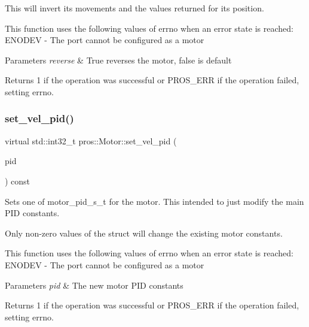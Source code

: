 This will invert its movements and the values returned for its position.

This function uses the following values of errno when an error state is reached\+: E\+N\+O\+D\+EV -\/ The port cannot be configured as a motor


\begin{DoxyParams}{Parameters}
{\em reverse} & True reverses the motor, false is default\\
\hline
\end{DoxyParams}
\begin{DoxyReturn}{Returns}
1 if the operation was successful or P\+R\+O\+S\+\_\+\+E\+RR if the operation failed, setting errno. 
\end{DoxyReturn}
\mbox{\label{classpros_1_1Motor_a69169ae0cd2b7f68ee533648c7830397}} 
\subsubsection{\texorpdfstring{set\+\_\+vel\+\_\+pid()}{set\_vel\_pid()}}
{\footnotesize\ttfamily virtual std\+::int32\+\_\+t pros\+::\+Motor\+::set\+\_\+vel\+\_\+pid (\begin{DoxyParamCaption}\item[{const \hyperlink{motors_8h_ad2e907c8d7ce53c1fd91f1b9801072e3}{motor\+\_\+pid\+\_\+s\+\_\+t}}]{pid }\end{DoxyParamCaption}) const\hspace{0.3cm}{\ttfamily [virtual]}}

Sets one of motor\+\_\+pid\+\_\+s\+\_\+t for the motor. This intended to just modify the main P\+ID constants.

Only non-\/zero values of the struct will change the existing motor constants.

This function uses the following values of errno when an error state is reached\+: E\+N\+O\+D\+EV -\/ The port cannot be configured as a motor


\begin{DoxyParams}{Parameters}
{\em pid} & The new motor P\+ID constants\\
\hline
\end{DoxyParams}
\begin{DoxyReturn}{Returns}
1 if the operation was successful or P\+R\+O\+S\+\_\+\+E\+RR if the operation failed, setting errno. 
\end{DoxyReturn}
\mbox{\label{classpros_1_1Motor_a7fc8eefc04c8b8aaefad75437b49f30a}} 
